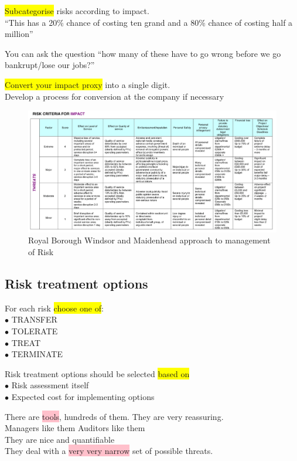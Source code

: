 \documentclass[tikz,border=10pt]{project_plan}
\newcommand{\bulletPoint}{\hspace{-3.1pt}$\bullet$ \hspace{5pt}}
\begin{document}
\colorbox{yellow}{Subcategorise} risks according to impact.\\
“This has a 20\% chance of  costing ten grand and a 80\% chance of costing half a million”

You can ask the question “how many of these have to go wrong before we go bankrupt/lose our jobs?”

\colorbox{yellow}{Convert your impact proxy} into a single digit. \\
Develop a process for conversion at the company if necessary

\begin{figure}[H]
  \centering
  \includegraphics[width=.8\linewidth]{risk impact.png}
  \caption{Royal Borough Windsor and Maidenhead approach to management of Risk}
\end{figure}

\newpage

\subsection{Risk treatment options}
For each risk \colorbox{yellow}{choose one of}: \\
\bulletPoint TRANSFER\\
\bulletPoint TOLERATE \\
\bulletPoint TREAT\\
\bulletPoint TERMINATE

Risk treatment options should be selected \colorbox{yellow}{based on}\\
\bulletPoint Risk assessment itself\\
\bulletPoint Expected cost for implementing options

There are \colorbox{pink}{tools}, hundreds of them. They are very reassuring.\\
Managers like them  Auditors like them \\
They are nice and quantifiable\\
They deal with a \colorbox{pink}{very very narrow} set of possible threats.
\end{document}
